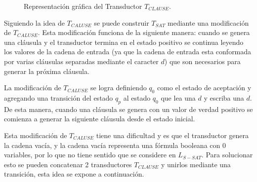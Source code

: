 \documentclass[12pt]{article}
\begin{document}
\begin{figure}[h]
    \centering  \begin{otherlanguage}{english}
    \end{otherlanguage}
    \caption{Representación gráfica del Transductor $T_{CLAUSE}$.}
    \label{fig:transducer_clause} %
\end{figure}

Siguiendo la idea de $T_{CALUSE}$ se puede construir $T_{SAT}$ mediante una modificación de $T_{CALUSE}$.
Esta modificación funciona de la siguiente manera: cuando se genera una cláusula y el transductor termina en el estado positivo se continua leyendo los valores de la cadena de entrada (ya que la cadena de entrada esta conformada por varias cláusulas separadas mediante el caracter $d$) que son necesarios para generar la próxima cláusula. 

La modificación de $T_{CALUSE}$ se logra definiendo $q_0$ como el estado de aceptación y agregando una transición 
del estado $q_p$ al estado $q_0$ que lea una $d$ y escriba una $d$. De esta manera, cuando una cláusula se genera 
con un valor de verdad positivo se comienza a generar la siguiente cláusula desde el estado inicial.

Esta modificación de $T_{CALUSE}$ tiene una dificultad y es que el transductor genera la cadena vacía, y la cadena vacía representa una fórmula booleana con 0 variables, por lo que no tiene sentido que se considere en $L_{S-SAT}$. Para solucionar esto se pueden concatenar 2 transductores $T_{CLAUSE}$ y unirlos mediante una transición, esta idea se expone a continuación.
\end{document}
